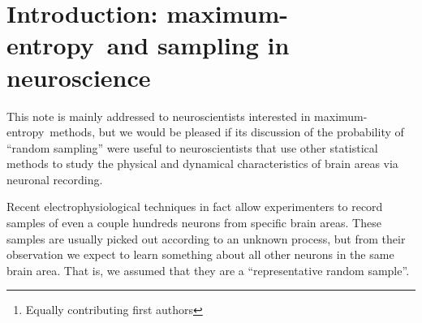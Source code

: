 \documentclass{article}
\title{\pdftitle}
\author{
  P.G.L. Porta Mana\thanks{Equally contributing first authors}\\Independent researcher\\\texttt{pgl@portamana.org}
  \And
  V. Rostami$^*$\\Forschungszentrum J{\"u}lich INM-6\\Germany\\\texttt{v.rostami@fz-juelich.de}
  \And
E. Torre\\ETH Z{\"u}rich\\Switzerland\\
\texttt{torre@ibk.baug.ethz.ch}
}
\theoremstyle{remark}
\theoremstyle{innote}
\newcommand*{\citep}{\parencites}
\renewcommand*{\cite}{\citep}
\renewcommand*{\|}{\mathpunct{|}}%
\theoremstyle{simple}
\newcommand*{\me}{maximum-entropy}
\begin{document}

\maketitle

\begin{abstract}
  This note has three nested purposes. The first purpose is to show that
  the \me\ method can be applied to a representative random sample of a
  population, to generate its probability distribution, along two different
  routes. Both routes appear legitimate, but they give inequivalent
  results. Which route should be chosen? Some arguments are presented in
  favour of one. The second more general purpose, motivated by the above
  dilemma, is to remind readers that models like \me\ may contain hidden
  assumptions; in this case the hidden an unnatural assumption that the
  sample modelled is isolated from the rest of the population. The third
  purpose is to promote some old but possibly forgotten probability
  formulae that may be useful in neuroscientific sampling contexts.
\end{abstract}

\section{Introduction: \me\ and sampling in neuroscience}

This note is mainly addressed to neuroscientists interested in \me\
methods, but we would be pleased if its discussion of the probability of
\enquote{random sampling} were useful to neuroscientists that use other
statistical methods to study the physical and dynamical characteristics of
brain areas via neuronal recording.

Recent electrophysiological techniques \cite{***} in fact allow
experimenters to record samples of even a couple hundreds neurons from
specific brain areas. These samples are usually picked out according to an
unknown process, but from their observation we expect to learn something
about all other neurons in the same brain area. That is, we assumed
that they are a \enquote{representative random sample}.
\end{document}
